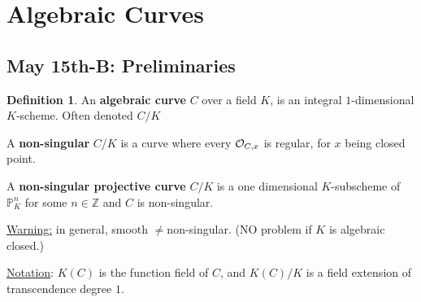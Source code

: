 \documentclass[11pt]{article}
\theoremstyle{definition}
\newtheorem{dfn}[thm]{Definition}
\newcommand{\proj}{\mathbb P}
\newcommand{\intg}{\mathbb Z}
\newcommand{\calo}{{\cal O}}
\begin{document}
\section{Algebraic Curves}
\subsection{May 15th-B: Preliminaries}
\begin{dfn}
An \textbf{algebraic curve} $C$ over a field $K$, is an integral $1$-dimensional $K$-scheme. Often denoted $C/K$

A \textbf{non-singular} $C/K$ is a curve where every $\calo_{C,x}$ is regular, for $x$  being closed point.

A \textbf{non-singular projective curve} $C/K$ is  a one dimensional $K$-subscheme of $\proj^n_K$ for some $n\in \intg$ and $C$ is non-singular.
\end{dfn}
\underline{Warning:} in general, smooth $\neq $non-singular. (NO problem if $K$ is algebraic closed.)

\underline{Notation}: $K(C)$ is the function field of $C$, and  $K(C)/K$
 is a field extension of transcendence degree $1$. 
\end{document}
